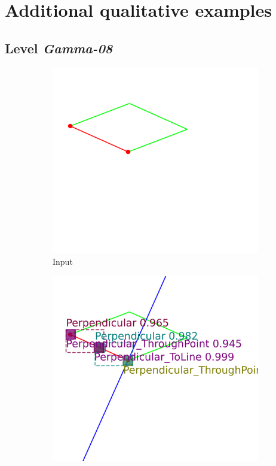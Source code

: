 \section{Additional qualitative examples}
\label{more_examples}
\subsection{Level \textit{Gamma-08}}
\begin{figure}[!htb]
     \centering
     \begin{subfigure}[t]{0.32\textwidth}
         \centering
         \includegraphics[width=\textwidth]{img/Gamma-08_example/input_image0.png}
         \caption{Input}
         \label{fig:Gamma08_example_input}
     \end{subfigure}
     \hfill
     \begin{subfigure}[t]{0.32\textwidth}
         \centering
         \includegraphics[width=\textwidth]{img/Gamma-08_example/output_image0.png}

\end{subfigure}
\end{figure}
